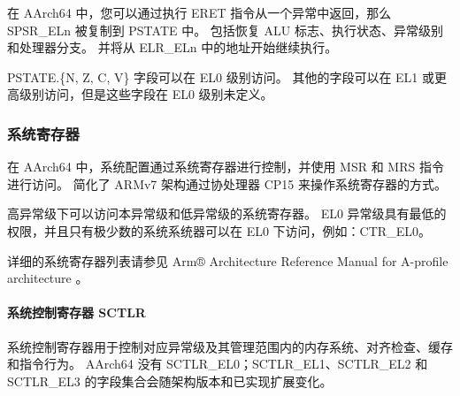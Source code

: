在 AArch64 中，您可以通过执行 ERET 指令从一个异常中返回，那么 SPSR\_ELn 被复制到 PSTATE 中。
包括恢复 ALU 标志、执行状态、异常级别和处理器分支。
并将从 ELR\_ELn 中的地址开始继续执行。

PSTATE.\{N, Z, C, V\} 字段可以在 EL0 级别访问。
其他的字段可以在 EL1 或更高级别访问，但是这些字段在 EL0 级别未定义。

\subsubsection{系统寄存器}

在 AArch64 中，系统配置通过系统寄存器进行控制，并使用 MSR 和 MRS 指令进行访问。
简化了 ARMv7 架构通过协处理器 CP15 来操作系统寄存器的方式。

高异常级下可以访问本异常级和低异常级的系统寄存器。
EL0 异常级具有最低的权限，并且只有极少数的系统系统器可以在 EL0 下访问，例如：CTR\_EL0。

详细的系统寄存器列表请参见 Arm® Architecture Reference Manual for A-profile architecture \cite{armrefman}。

\paragraph*{系统控制寄存器 SCTLR}

系统控制寄存器用于控制对应异常级及其管理范围内的内存系统、对齐检查、缓存和指令行为。
AArch64 没有 SCTLR\_EL0；SCTLR\_EL1、SCTLR\_EL2 和 SCTLR\_EL3 的字段集合会随架构版本和已实现扩展变化。


